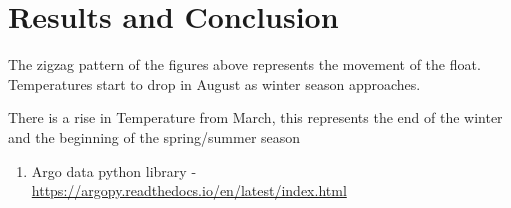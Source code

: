\documentclass[20pt]{article}
\begin{document}

\section{Results and Conclusion}
The zigzag pattern of the figures above represents the movement of the float. Temperatures start to  drop in August as winter season approaches.

There is a rise in Temperature from March, this represents the end of the winter and the beginning of the spring/summer season





\begin{enumerate}
\item Argo data python library - \url{ https://argopy.readthedocs.io/en/latest/index.html}
\end{enumerate}

\end{document}
